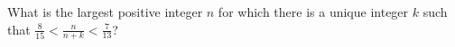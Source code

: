 What is the largest positive integer $n$ for which there is a unique integer $k$ such that $\frac{8}{15} < \frac{n}{n + k} < \frac{7}{13}$?